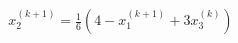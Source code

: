 \documentclass[preview]{standalone}
\begin{document}
\begin{align*}
x_2^{(k+1)} = \frac{1}{6}(4 - x_1^{(k+1)} + 3x_3^{(k)})
\end{align*}
\end{document}
